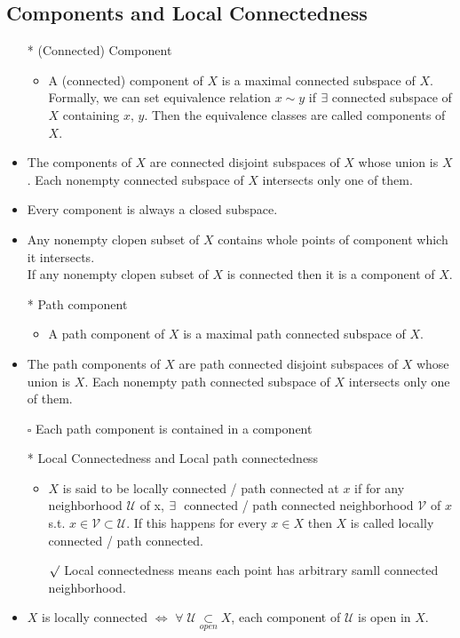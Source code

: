 \documentclass[12pt]{article}
\newcommand{\sq}{$\square$}
\newcommand{\rmk}{$\surd$}
\newcommand{\spone}{\hspace{0.1cm}}
\newcommand{\U}{\mathcal{U}}
\newcommand{\V}{\mathcal{V}}
\newcommand{\open}{\underset{open}{\subset}}
\newcommand{\exist}{\exists\spone}
\begin{document}
\subsection{Components and Local Connectedness}
\smallskip
\begin{itemize}
	\item[*] (Connected) Component
	\begin{itemize}
		\item A (connected) component of $X$ is a maximal connected subspace of $X$. Formally, we can set equivalence relation $x\sim y$ if $\exist $connected subspace of $X$ containing $x$, $y$. Then the equivalence classes are called components of $X$. 
	\end{itemize}
	\item The components of $X$ are connected disjoint subspaces of $X$ whose union is $X$. Each nonempty connected subspace of $X$ intersects only one of them.
	\item Every component is always a closed subspace.
	\item Any nonempty clopen subset of $X$ contains whole points of component which it intersects.
	\\If any nonempty clopen subset of $X$ is connected then it is a component of $X$.   
	\item[*] Path component
	\begin{itemize}
		\item A path component of $X$ is a maximal path connected subspace of $X$.
	\end{itemize}  
	\item The path components of $X$ are path connected disjoint subspaces of $X$ whose union is $X$. Each nonempty path connected subspace of $X$ intersects only one of them.
	\item[\sq] Each path component is contained in a component 
	\item[*] Local Connectedness and Local path connectedness
	\begin{itemize}
		\item $X$ is said to be locally connected / path connected at $x$ if for any neighborhood $\U$ of x, $\exist $ connected / path connected neighborhood $\V$ of $x$ s.t. $x\in \V \subset \U$. If this happens for every $x\in X$ then $X$ is called locally connected / path connected.
		\item[\rmk] Local connectedness means each point has arbitrary samll connected neighborhood. 
	\end{itemize}
	\item $X$ is locally connected $\Leftrightarrow$ $\forall\; \U \open X$, each component of $\U$ is open in $X$.

\end{itemize}
\end{document}
